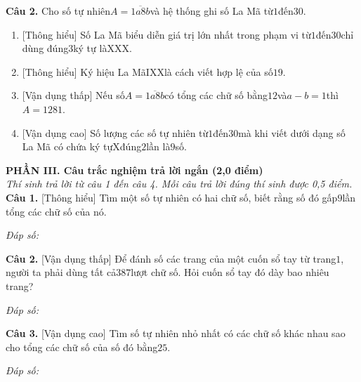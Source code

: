\documentclass[11pt,a4paper]{article}
\begin{document}
\noindent\textbf{Câu 2.} Cho số tự nhiên$A = \overline{1a8b}$và hệ thống ghi số La Mã từ$1$đến$30$.\par\vspace{2pt}
\begin{enumerate}[label=\textbf{\alph*)}, leftmargin=1.2cm, itemsep=2pt, topsep=2pt]
  \item \textnormal{[Thông hiểu]} Số La Mã biểu diễn giá trị lớn nhất trong phạm vi từ$1$đến$30$chỉ dùng đúng$3$ký tự là$\mathrm{XXX}$.
  \item \textnormal{[Thông hiểu]} Ký hiệu La Mã$\mathrm{IXX}$là cách viết hợp lệ của số$19$.
  \item \textnormal{[Vận dụng thấp]} Nếu số$A = \overline{1a8b}$có tổng các chữ số bằng$12$và$a - b = 1$thì$A = 1281$.
  \item \textnormal{[Vận dụng cao]} Số lượng các số tự nhiên từ$1$đến$30$mà khi viết dưới dạng số La Mã có chứa ký tự$\mathrm{X}$đúng$2$lần là$9$số.
\end{enumerate}
\vspace{6pt}


\vspace{6pt}
\noindent
\textbf{\large PHẦN III. Câu trắc nghiệm trả lời ngắn (2,0 điểm)}\\
\textit{\small Thí sinh trả lời từ câu 1 đến câu 4. Mỗi câu trả lời đúng thí sinh được 0,5 điểm.}
\vspace{6pt}
\noindent\textbf{Câu 1.} [Thông hiểu] Tìm một số tự nhiên có hai chữ số, biết rằng số đó gấp$9$lần tổng các chữ số của nó.\par\vspace{2pt}
\noindent\textit{Đáp số:} \dotfill\par\vspace{6pt}

\noindent\textbf{Câu 2.} [Vận dụng thấp] Để đánh số các trang của một cuốn sổ tay từ trang$1$, người ta phải dùng tất cả$387$lượt chữ số. Hỏi cuốn sổ tay đó dày bao nhiêu trang?\par\vspace{2pt}
\noindent\textit{Đáp số:} \dotfill\par\vspace{6pt}

\noindent\textbf{Câu 3.} [Vận dụng cao] Tìm số tự nhiên nhỏ nhất có các chữ số khác nhau sao cho tổng các chữ số của số đó bằng$25$.\par\vspace{2pt}
\noindent\textit{Đáp số:} \dotfill\par\vspace{6pt}
\end{document}

